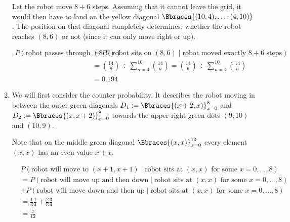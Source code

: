 \begin{solution}
\begin{enumerate}[label = (\alph*)]
    Let the robot move $8 + 6$ steps.
    Assuming that it cannot leave the grid, it would then have to land on the yellow diagonal $\Bbraces{(10, 4), \dots, (4, 10)}$.
    The position on that diagonal completely determines, whether the robot reaches $(8, 6)$ or not (since it can only move right or up).
    
    \begin{align*}
        P(\text{robot passes through $(8, 6)$})
        & =
        P(\text{robot sits on $(8, 6)$} \mid \text{robot moved exactly $8 + 6$ steps}) \\
        & =
        \binom{14}{8} \div \sum_{n=4}^{10} \binom{14}{n}
        =
        \binom{14}{6} \div \sum_{n=4}^{10} \binom{14}{n} \\
        & =
        0.19 \dot 4
    \end{align*}

    \item We will first consider the counter probability.
    It describes the robot moving in between the outer green diagonals $D_1 := \Bbraces{(x+2, x)}_{x=0}^8$ and $D_2 := \Bbraces{(x, x+2)}_{x=0}^8$ towards the upper right green dots $(9, 10)$ and $(10, 9)$.

    Note that on the middle green diagonal $\Bbraces{(x, x)}_{x=0}^{10}$ every element $(x, x)$ has an even value $x + x$.

    \begin{align*}
        &
        P(\text{robot will move to $(x+1, x+1)$} \mid \text{robot sits at $(x, x)$ for some $x = 0, \dots, 8$}) \\
        & =
        P(\text{robot will move up and then down} \mid \text{robot sits at $(x, x)$ for some $x = 0, \dots, 8$}) \\
        & +
        P(\text{robot will move down and then up} \mid \text{robot sits at $(x, x)$ for some $x = 0, \dots, 8$}) \\
        & =
        \frac{1}{3} \frac{1}{4} + \frac{2}{3} \frac{3}{4} \\
        & =
        \frac{7}{12}
    \end{align*}


\end{enumerate}
\end{solution}

